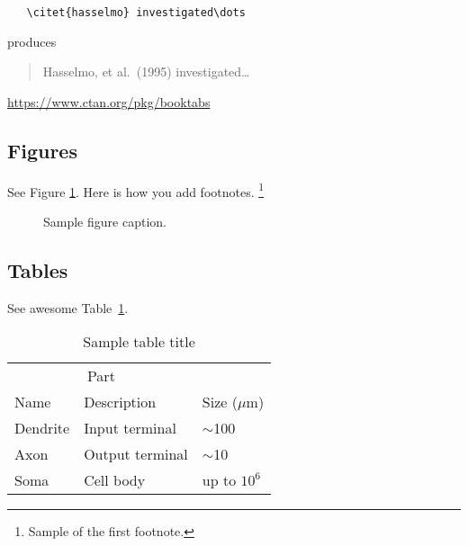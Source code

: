 \documentclass{article}
\begin{document}
\begin{verbatim}
   \citet{hasselmo} investigated\dots
\end{verbatim}

produces

\begin{quote}
  Hasselmo, et al.\ (1995) investigated\dots
\end{quote}

\begin{center}
  \url{https://www.ctan.org/pkg/booktabs}
\end{center}

\subsection{Figures}
    \lipsum[10] 
    See Figure \ref{fig:fig1}. Here is how you add footnotes. \footnote{Sample of the first footnote.}
    \lipsum[11] 
    
    \begin{figure}
      \centering
      \fbox{\rule[-.5cm]{4cm}{4cm} \rule[-.5cm]{4cm}{0cm}}
      \caption{Sample figure caption.}
      \label{fig:fig1}
    \end{figure}
    
    \subsection{Tables}
    \lipsum[12]
    See awesome Table~\ref{tab:table}.
    
    \begin{table}
     \caption{Sample table title}
      \centering
      \begin{tabular}{lll}
        \toprule
        \multicolumn{2}{c}{Part}                   \\
        \cmidrule(r){1-2}
        Name     & Description     & Size ($\mu$m) \\
        \midrule
        Dendrite & Input terminal  & $\sim$100     \\
        Axon     & Output terminal & $\sim$10      \\
        Soma     & Cell body       & up to $10^6$  \\
        \bottomrule
      \end{tabular}
      \label{tab:table}
    \end{table}

\end{document}
